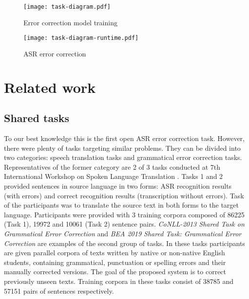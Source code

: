 \documentclass[10pt, a4paper]{article}
\begin{document}
\begin{figure}[htbp]
  \centering
  \texttt{[image: task-diagram.pdf]}
  \caption{Error correction model training}
\end{figure}

\begin{figure}[htbp]
  \centering
  \texttt{[image: task-diagram-runtime.pdf]}
  \caption{ASR error correction}
\end{figure}


\section{Related work}
\subsection{Shared tasks}
To our best knowledge this is the first open ASR error correction task. However, there were plenty of tasks targeting similar problems. They can be divided into two categories: speech translation tasks and grammatical error correction tasks.
Representatives of the former category are 2 of 3 tasks conducted at 7th International Workshop on
Spoken Language Translation  \cite{iwslt10:EC:overview}. Tasks 1 and 2 provided sentences in source
language in two forms: ASR recognition results (with errors) and correct recognition results
(transcription without errors). Task of the participants was to translate the source text in both
forms to the target language. Participants were provided with 3 training corpora composed of 86225 (Task 1), 19972 and 10061 (Task 2) sentence pairs.
\textit{CoNLL-2013 Shared Task on Grammatical Error Correction} \cite{ng_conll-2013_2013} and
\textit{BEA 2019 Shared Task: Grammatical Error Correction} \cite{BEA2019} are examples of the
second group of tasks. In these tasks participants are given parallel corpora of texts written by
native or non-native English students, containing grammatical, punctuation or spelling errors and
their manually corrected versions. The goal of the proposed system is to correct previously unseen texts. Training corpora in these tasks consist of 38785 and 57151 pairs of sentences respectively.
\end{document}
